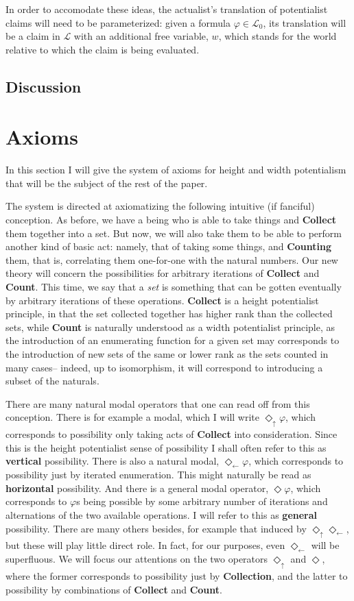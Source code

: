 \documentclass{article}
\newcommand{\du}{\Diamond_\uparrow}
\newcommand{\dl}{\Diamond_\leftarrow}
\begin{document}
In order to accomodate these ideas, the actualist's translation of potentialist claims 
will need to be parameterized: given a formula $\varphi \in \mathcal{L}_0$, its 
translation will be a claim in $\mathcal{L}$ with an additional free variable, $w$, 
which stands for the world relative to which the claim is being evaluated. 


\subsection{Discussion}
\section{Axioms}
In this section I will give the system of axioms for height and width potentialism 
that will be the subject of the rest of the paper.

The system is directed at axiomatizing the following intuitive (if fanciful) conception.
As before, we have a being who is able to take things and {\bf Collect} them together into a set.
But now, we will also take them to be able to perform another kind of basic act: namely, 
that of taking some things, and {\bf Counting} them, that is, correlating them one-for-one
with the natural numbers. Our new theory will concern the possibilities for arbitrary iterations 
of {\bf Collect} and {\bf Count}. This time, we say that a \emph{set} is something that can be 
gotten eventually by arbitrary iterations of these operations. {\bf Collect} is a height potentialist 
principle, in that the set collected together has higher rank than the collected sets, 
while {\bf Count} is naturally understood as a width potentialist principle, 
as the introduction of an enumerating function for a given set may corresponds to the introduction 
of new sets of the same or lower rank as the sets counted in many cases--
indeed, up to isomorphism, it will correspond to introducing a subset of the naturals.

There are many natural modal operators that one can read off from this conception. 
There is for example a modal, which I will write $\du \varphi$, which corresponds to 
possibility only taking acts of {\bf Collect} into consideration. Since this is the 
height potentialist sense of possibility I shall often refer to this as {\bf vertical}
possibility. There is also a natural modal, $\dl \varphi$, which corresponds to possibility 
just by iterated enumeration. This might naturally be read as {\bf horizontal} possibility.
 And there is a general modal operator, $\Diamond \varphi$, which 
corresponds to $\varphi$s being possible by some arbitrary number of iterations and alternations 
of the two available operations. I will refer to this as {\bf general} possibility. There are 
many others besides, for example that induced by $\du\dl$, but these will play little direct role.
In fact, for our purposes, even $\dl$ will be superfluous. We will focus our attentions on 
the two operators $\du$ and $\Diamond$, where the former corresponds to possibility just by 
{\bf Collection}, and the latter to possibility by combinations of {\bf Collect} and {\bf Count}.
\end{document}

